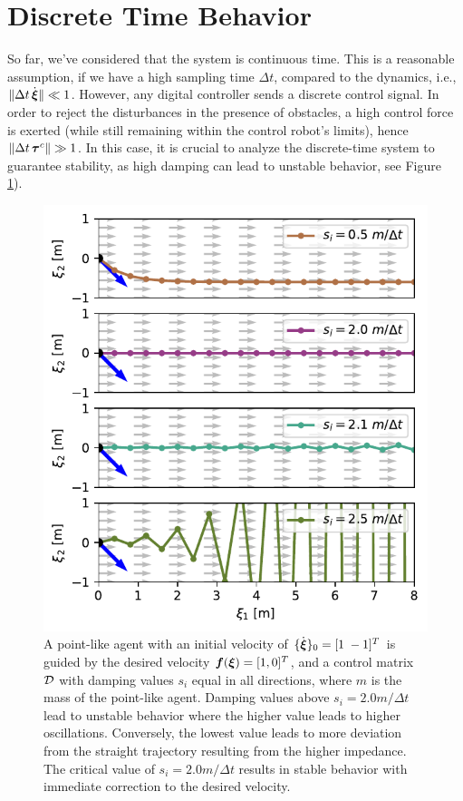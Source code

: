 \section{Discrete Time Behavior} \label{sec:discrete_time_behavior}
So far, we've considered that the system is continuous time. 
This is a reasonable assumption, if we have a high sampling time $\Delta t$, compared to the dynamics, i.e., $\| \Delta t \, \dot{\boldsymbol{\xi}} \| \ll 1$.
However, any digital controller sends a discrete control signal. In order to reject the disturbances in the presence of obstacles, a high control force is exerted (while still remaining within the control robot's limits), hence $\| \Delta t \, \boldsymbol{\tau}^c \| \gg 1$. 
In this case, it is crucial to analyze the discrete-time system to guarantee stability, as high damping can lead to unstable behavior, see Figure~
\ref{fig:discrete_controller_parameters_comparison}).

\begin{figure}[htb]
\centering
  \includegraphics[width=\columnwidth]{figures/discrete_controller_parameters_comparison}
  \caption{A point-like agent with an initial velocity of $\{ \dot{\boldsymbol{\xi}} \}_0 = [1 \; -1]^T$ is guided by the desired velocity $\boldsymbol{f}(\boldsymbol{\xi}) = [1, 0]^T$, and a control matrix $\mathcal{D}$ with damping values $s_i$ equal in all directions, where $m$ is the mass of the point-like agent. 
  Damping values above $s_i = 2.0 m / \Delta t$ lead to unstable behavior where the higher value leads to higher oscillations. Conversely, the lowest value leads to more deviation from the straight trajectory resulting from the higher impedance. The critical value of $s_i = 2.0 m / \Delta t$ results in stable behavior with immediate correction to the desired velocity.}
  \label{fig:discrete_controller_parameters_comparison}
\end{figure}

